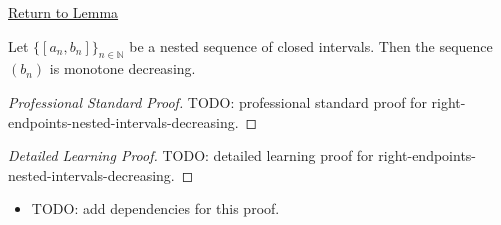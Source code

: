 \newpage
{}
\label{prf:right-endpoints-nested-intervals-decreasing}

\begin{remark*}[Return]
\hyperref[lem:right-endpoints-nested-intervals-decreasing]{Return to Lemma}
\end{remark*}

\begin{lemma*}
Let $\{[a_n,b_n]\}_{n\in\mathbb N}$ be a nested sequence of closed intervals.
Then the sequence $(b_n)$ is monotone decreasing.
\end{lemma*}

\begin{proof}[Professional Standard Proof]
\LRAProofBodyStart
TODO: professional standard proof for right-endpoints-nested-intervals-decreasing.
\end{proof}

\begin{proof}[Detailed Learning Proof]
\LRAProofBodyStart
TODO: detailed learning proof for right-endpoints-nested-intervals-decreasing.
\end{proof}

\begin{remark*}
\end{remark*}

\begin{dependencies}
\begin{itemize}
  \item TODO: add dependencies for this proof.
\end{itemize}
\end{dependencies}

\clearpage
